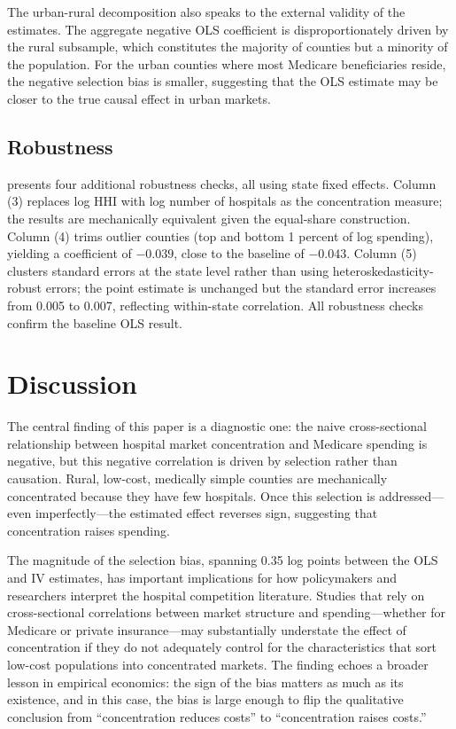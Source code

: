 \documentclass[12pt]{article}
\begin{document}
The urban-rural decomposition also speaks to the external validity of the estimates. The aggregate negative OLS coefficient is disproportionately driven by the rural subsample, which constitutes the majority of counties but a minority of the population. For the urban counties where most Medicare beneficiaries reside, the negative selection bias is smaller, suggesting that the OLS estimate may be closer to the true causal effect in urban markets.

\subsection{Robustness}

 presents four additional robustness checks, all using state fixed effects. Column (3) replaces log HHI with log number of hospitals as the concentration measure; the results are mechanically equivalent given the equal-share construction. Column (4) trims outlier counties (top and bottom 1 percent of log spending), yielding a coefficient of $-0.039$, close to the baseline of $-0.043$. Column (5) clusters standard errors at the state level rather than using heteroskedasticity-robust errors; the point estimate is unchanged but the standard error increases from 0.005 to 0.007, reflecting within-state correlation. All robustness checks confirm the baseline OLS result.




\section{Discussion}

The central finding of this paper is a diagnostic one: the naive cross-sectional relationship between hospital market concentration and Medicare spending is negative, but this negative correlation is driven by selection rather than causation. Rural, low-cost, medically simple counties are mechanically concentrated because they have few hospitals. Once this selection is addressed---even imperfectly---the estimated effect reverses sign, suggesting that concentration raises spending.

The magnitude of the selection bias, spanning 0.35 log points between the OLS and IV estimates, has important implications for how policymakers and researchers interpret the hospital competition literature. Studies that rely on cross-sectional correlations between market structure and spending---whether for Medicare or private insurance---may substantially understate the effect of concentration if they do not adequately control for the characteristics that sort low-cost populations into concentrated markets. The finding echoes a broader lesson in empirical economics: the sign of the bias matters as much as its existence, and in this case, the bias is large enough to flip the qualitative conclusion from ``concentration reduces costs'' to ``concentration raises costs.''
\end{document}
